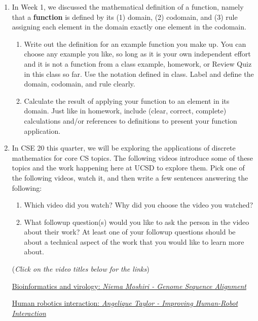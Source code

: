 \begin{enumerate}
\item 

In Week 1, we discussed the mathematical definition of a function, namely
that a {\bf function} is defined by its (1) domain, (2) codomain, and (3) rule assigning each 
element in the domain exactly one element in the codomain.

\begin{enumerate}
    \item Write out the definition for an example function you make up.
    You can choose any example you like, so long as it is your own independent 
    effort and it is not a function from a class example, homework, or Review Quiz in this class so far.
    Use the notation defined in class. Label and define the domain, codomain, and rule clearly.
    \item Calculate the result of applying your function to an element in its domain.
    Just like in homework, include (clear, correct, complete) calculations and/or references to definitions
    to present your function application.
\end{enumerate}

\item In CSE 20 this quarter, we will be exploring the applications of discrete mathematics for core CS topics. 
The following videos introduce some of these topics and the 
work happening here at UCSD to explore them. Pick one of the following videos, watch it, and 
then write a few sentences answering the following:
\begin{enumerate}
\item Which video did you watch? Why did you choose the video you watched?
\item What followup question(s) would you like to ask the person in the video about their work?
At least one of your followup questions should be about a technical aspect of the work that you
would like to learn more about.
\end{enumerate}

({\it Click on the video titles below for the links})

\href{https://www.youtube.com/watch?v=PrAoks7OhE8}{Bioinformatics and virology: 
{\it Niema Moshiri - Genome Sequence Alignment}}

\href{https://www.uctv.tv/computer-science/search-details.aspx?showID=33425}{Human robotics interaction: 
{\it Angelique Taylor - Improving Human-Robot Interaction}}


\end{enumerate}
